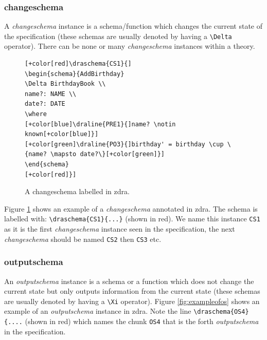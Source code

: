 \subsubsection{changeschema}

A \emph{changeschema} instance is a schema/function which changes the current state of the specification (these schemas are usually denoted by having a \verb|\Delta| operator). There can be none or many \emph{changeschema} instances within a theory.

\begin{center}
\begin{figure}[H]
\centering
\begin{footnotesize}
\begin{BVerbatim}[commandchars=+\[\]]
[+color[red]\draschema{CS1}{]
\begin{schema}{AddBirthday}
\Delta BirthdayBook \\
name?: NAME \\
date?: DATE
\where
[+color[blue]\draline{PRE1}{]name? \notin known[+color[blue]}]
[+color[green]\draline{PO3}{]birthday' = birthday \cup \{name? \mapsto date?\}[+color[green]}]
\end{schema}
[+color[red]}]
\end{BVerbatim}
\end{footnotesize}
\caption{\label{fig:exampleofcs} A changeschema labelled in \gls{zdra}.}
\end{figure}
\end{center}

Figure \ref{fig:exampleofcs} shows an example of a \emph{changeschema} annotated in \gls{zdra}. The schema is labelled with: \verb|\draschema{CS1}{...}| (shown in red). We name this instance \verb|CS1| as it is the first \emph{changeschema} instance seen in the specification, the next \emph{changeschema} should be named \verb|CS2| then \verb|CS3| etc.

\subsubsection{outputschema}

An \emph{outputschema} instance is a schema or a function which does not change the current state but only outputs information from the current state (these schemas are usually denoted by having a \verb|\Xi| operator). Figure \ref{fig:exampleofos} shows an example of an \emph{outputschema} instance in \gls{zdra}. Note the line \verb|\draschema{OS4}{....| (shown in red) which names the chunk \verb|OS4| that is the forth \emph{outputschema} in the specification.

